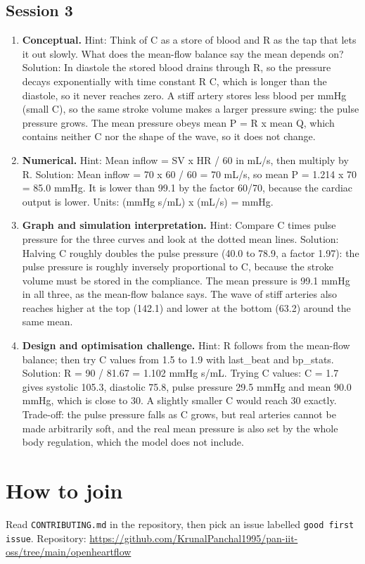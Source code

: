 \documentclass[11pt,a4paper]{article}
\begin{document}
\subsection*{Session 3}
\begin{enumerate}[nosep]
\item \textbf{Conceptual.} Hint: Think of C as a store of blood and R as the tap that lets it out slowly. What does the mean-flow balance say the mean depends on? Solution: In diastole the stored blood drains through R, so the pressure decays exponentially with time constant R C, which is longer than the diastole, so it never reaches zero. A stiff artery stores less blood per mmHg (small C), so the same stroke volume makes a larger pressure swing: the pulse pressure grows. The mean pressure obeys mean P = R x mean Q, which contains neither C nor the shape of the wave, so it does not change.
\item \textbf{Numerical.} Hint: Mean inflow = SV x HR / 60 in mL/s, then multiply by R. Solution: Mean inflow = 70 x 60 / 60 = 70 mL/s, so mean P = 1.214 x 70 = 85.0 mmHg. It is lower than 99.1 by the factor 60/70, because the cardiac output is lower. Units: (mmHg s/mL) x (mL/s) = mmHg.
\item \textbf{Graph and simulation interpretation.} Hint: Compare C times pulse pressure for the three curves and look at the dotted mean lines. Solution: Halving C roughly doubles the pulse pressure (40.0 to 78.9, a factor 1.97): the pulse pressure is roughly inversely proportional to C, because the stroke volume must be stored in the compliance. The mean pressure is 99.1 mmHg in all three, as the mean-flow balance says. The wave of stiff arteries also reaches higher at the top (142.1) and lower at the bottom (63.2) around the same mean.
\item \textbf{Design and optimisation challenge.} Hint: R follows from the mean-flow balance; then try C values from 1.5 to 1.9 with last\_beat and bp\_stats. Solution: R = 90 / 81.67 = 1.102 mmHg s/mL. Trying C values: C = 1.7 gives systolic 105.3, diastolic 75.8, pulse pressure 29.5 mmHg and mean 90.0 mmHg, which is close to 30. A slightly smaller C would reach 30 exactly. Trade-off: the pulse pressure falls as C grows, but real arteries cannot be made arbitrarily soft, and the real mean pressure is also set by the whole body regulation, which the model does not include.
\end{enumerate}

\section{How to join}
Read \texttt{CONTRIBUTING.md} in the repository, then pick an issue labelled \texttt{good first issue}. Repository: \url{https://github.com/KrunalPanchal1995/pan-iit-oss/tree/main/openheartflow}
\end{document}

